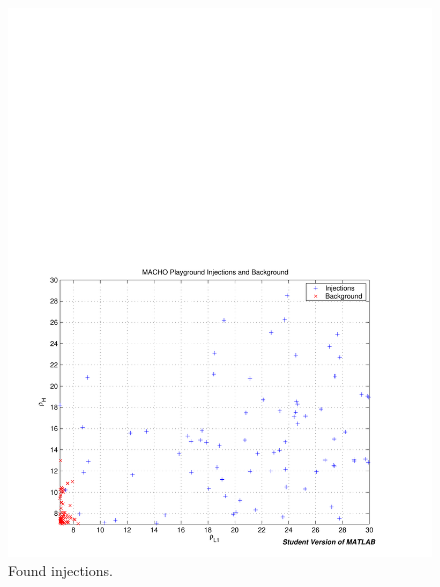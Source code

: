 \begin{figure}[p]
\begin{center}
\includegraphics[width=\textwidth]{analysis/figures/inj_bkg_snr}
\end{center}
\caption{\label{f:pipeline}%
Found injections.
}
\end{figure}

